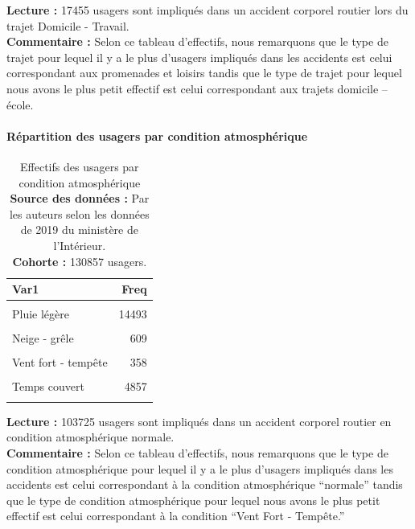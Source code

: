 \documentclass[french,]{tp}
\let\oldparagraph\paragraph
\renewcommand{\paragraph}[1]{\oldparagraph{#1}\mbox{}}
\begin{document}
\textbf{Lecture :} 17455 usagers sont impliqués dans un accident corporel routier lors du trajet Domicile - Travail.\\
\textbf{Commentaire :} Selon ce tableau d'effectifs, nous remarquons que le type de trajet pour lequel il y a le plus d'usagers impliqués dans les accidents est celui correspondant aux promenades et loisirs tandis que le type de trajet pour lequel nous avons le plus petit effectif est celui correspondant aux trajets domicile -- école.

\hypertarget{ruxe9partition-des-usagers-par-condition-atmosphuxe9rique}{%
\paragraph{Répartition des usagers par condition atmosphérique}\label{ruxe9partition-des-usagers-par-condition-atmosphuxe9rique}}





\begin{table}[H]

\caption{\label{tab:tablecond}Effectifs des usagers par condition atmosphérique\\
\textbf{Source des données :} Par les auteurs selon les données de 2019 du ministère de l'Intérieur.\\
\textbf{Cohorte :} 130857 usagers.\\}
\centering
\begin{tabular}[t]{lr}
\toprule
\textbf{Var1} & \textbf{Freq}\\
\midrule
\cellcolor{gray!6}{Normale} & \cellcolor{gray!6}{103725}\\
Pluie légère & 14493\\
\cellcolor{gray!6}{Pluie forte} & \cellcolor{gray!6}{3183}\\
Neige - grêle & 609\\
\cellcolor{gray!6}{Brouillard - fumée} & \cellcolor{gray!6}{708}\\
\addlinespace
Vent fort - tempête & 358\\
\cellcolor{gray!6}{Temps éblouissant} & \cellcolor{gray!6}{2288}\\
Temps couvert & 4857\\
\cellcolor{gray!6}{Autre} & \cellcolor{gray!6}{636}\\
\bottomrule
\end{tabular}
\end{table}

\textbf{Lecture :} 103725 usagers sont impliqués dans un accident corporel routier en condition atmosphérique normale.\\
\textbf{Commentaire :} Selon ce tableau d'effectifs, nous remarquons que le type de condition atmosphérique pour lequel il y a le plus d'usagers impliqués dans les accidents est celui correspondant à la condition atmosphérique ``normale'' tandis que le type de condition atmosphérique pour lequel nous avons le plus petit effectif est celui correspondant à la condition ``Vent Fort - Tempête.''
\end{document}
